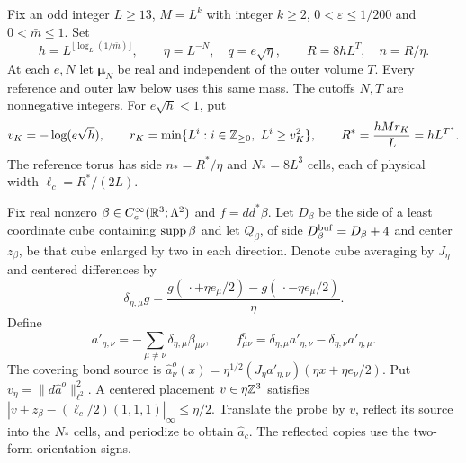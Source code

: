 Fix an odd integer $L\ge13$, $M=L^k$ with integer $k\ge2$,
$0<\varepsilon\le1/200$ and $0<\bar m\le1$. Set
\begin{equation}\label{eq:cutoff-scales}
 h=L^{\lfloor\log_L(1/\bar m)\rfloor},\qquad
 \eta=L^{-N},\quad q=e\sqrt\eta,\qquad R=8hL^T,\quad n=R/\eta.
\end{equation}
At each $e,N$ let $\boldsymbol\mu_N$ be real and independent
of the outer volume $T$. Every reference and outer law below
uses this same mass. The cutoffs $N,T$ are nonnegative integers.
For $e\sqrt h<1$, put
\[
 v_K=-\log(e\sqrt h),\qquad
 r_K=\min\{L^i:i\in\mathbb Z_{\ge0},\ L^i\ge v_K^2\},
 \qquad R^*=\frac{hMr_K}{L}=hL^{T^*}.
\]
The reference torus has side $n_*=R^*/\eta$ and
$N_*=8L^3$ cells, each of physical width $\ell_c=R^*/(2L)$.

Fix real nonzero $\beta\in C_c^\infty(\mathbb R^3;\Lambda^2)$ and
$f=dd^*\beta$. Let $D_\beta$ be the side of a least coordinate
cube containing $\operatorname{supp}\beta$ and let $Q_\beta$, of side
$D_\beta^{\rm buf}=D_\beta+4$ and center $z_\beta$, be that
cube enlarged by two in each direction. Denote cube averaging
by $J_\eta$ and centered differences by
\[
 \delta_{\eta,\mu}g=
 \frac{g(\,\cdot+\eta e_\mu/2)-g(\,\cdot-\eta e_\mu/2)}{\eta}.
\]
Define
\begin{equation}\label{eq:cells-smooth-test}
 a'_{\eta,\nu}=-\sum_{\mu\ne\nu}\delta_{\eta,\mu}\beta_{\mu\nu},
 \qquad
 f^\eta_{\mu\nu}=\delta_{\eta,\mu}a'_{\eta,\nu}
                     -\delta_{\eta,\nu}a'_{\eta,\mu}.
\end{equation}
The covering bond source is
$\widehat a^o_\nu(x)=\eta^{1/2}(J_\eta a'_{\eta,\nu})(\eta x+\eta e_\nu/2)$.
Put $v_\eta=\|d\widehat a^o\|_{\ell^2}^2$.
A centered placement $v\in\eta\mathbb Z^3$ satisfies
$|v+z_\beta-(\ell_c/2)(1,1,1)|_\infty\le\eta/2$.
Translate the probe by $v$, reflect its source into the
$N_*$ cells, and periodize to obtain $\widehat a_c$.
The reflected copies use the two-form orientation signs.

